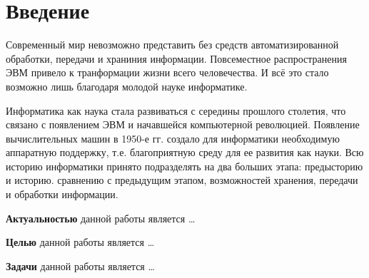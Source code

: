 \chapter*{Введение}							%


Современный мир невозможно представить без средств автоматизированной обработки, передачи и храниния информации. Повсеместное распространения ЭВМ привело к транформации жизни всего человечества. И всё это стало возможно лишь благодаря молодой науке информатике.

Информатика как наука стала развиваться с середины прошлого столетия, что связано с появлением ЭВМ и начавшейся компьютерной революцией. Появление вычислительных машин в 1950-е гг. создало для информатики необходимую аппаратную поддержку, т.е. благоприятную среду для ее развития как науки. Всю историю информатики принято подразделять на два больших этапа: предысторию и историю.
 сравнению с предыдущим этапом, возможностей хранения, передачи и обработки информации.

\textbf{Актуальностью} данной работы является \ldots

\textbf{Целью} данной работы является \ldots

\textbf{Задачи} данной работы является \ldots

\clearpage
